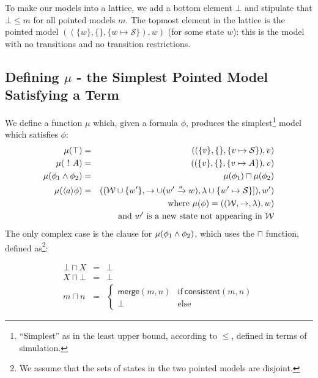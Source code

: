 To make our models into a lattice, we add a bottom element $\bot$ and stipulate that $\bot \leq m$ for all pointed models $m$.
The topmost element in the lattice is the pointed model $( (\{w\}, \{\}, \{w \mapsto \mathcal{S}\}), w)$ (for some state $w$): this is the model with no transitions and no transition restrictions.

\subsection{Defining $\mu$ - the Simplest Pointed Model Satisfying a Term}
We define a function $\mu$ which, given a formula $\phi$, produces the simplest\footnote{``Simplest'' as in the least upper bound, according to $\leq$, defined in terms of simulation.} model which satisfies $\phi$:
\begin{eqnarray}
\mu (\top) & = & ( (\{v\}, \{\}, \{v \mapsto \mathcal{S}\}), v) \nonumber \\
\mu (\ ! \  A) & = & ( (\{v\}, \{\}, \{v \mapsto A\}), v) \nonumber \\
\mu (\phi_1 \land \phi_2) & = & \mu(\phi_1) \sqcap \mu(\phi_2) \nonumber \\
\mu (\langle a \rangle \phi) & = & ( (\mathcal{W} \cup \{w'\}, \rightarrow \cup (w' \xrightarrow{a} w), \lambda \cup \{w' \mapsto \mathcal{S}\}]), w') \nonumber \\
		& & \mbox{where }\mu(\phi) = ( (\mathcal{W}, \rightarrow, \lambda), w) \nonumber \\
		& & \mbox{and }w' \mbox{ is a new state not appearing in }\mathcal{W} \nonumber
\end{eqnarray}
The only complex case is the clause for $\mu (\phi_1 \land \phi_2)$, which uses the $\sqcap$ function, defined as\footnote{We assume that the sets of states in the two pointed models are disjoint.}:

\begin{eqnarray*}
  \bot \sqcap X 
     & = & 
  \bot \nonumber 
     \\
  X \sqcap \bot 
     & = & 
  \bot \nonumber 
     \\
  m \sqcap n 
     & = & 
  \begin{cases}
    \mathsf{merge}(m, n) & \text{if}\ \mathsf{consistent}(m, n) \\
    \bot & \text{else}
  \end{cases}
\end{eqnarray*}


